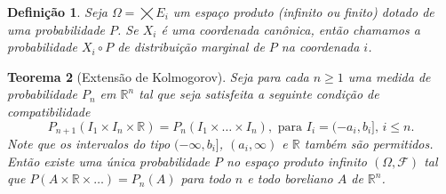\documentclass[reqno]{article}
\newcommand*\1{\mathds{1}}
\newtheorem{theorem}{Teorema}[section]
\newtheorem{definition}[theorem]{Definição}
\begin{document}
\begin{definition}
  Seja $\Omega = \bigtimes E_i$ um espaço produto (infinito ou finito) dotado de uma probabilidade $P$.
  Se $X_i$ é uma coordenada canônica, então chamamos a probabilidade $X_i \circ P$ de \emph{distribuição marginal} de $P$ na coordenada $i$.
\end{definition}

\begin{theorem}[Extensão de Kolmogorov]
  \label{t:extens_kolmog}
  Seja para cada $n \geq 1$ uma medida de probabilidade $P_n$ em $\mathbb{R}^n$ tal que seja satisfeita a seguinte condição de compatibilidade
  \begin{equation}
    \label{e:consist_kolmog}
    P_{n+1} (I_1 \times I_n \times \mathbb{R}) = P_n (I_1 \times \dots \times I_n), \text{ para $I_i = (-a_i, b_i]$, $i \leq n$}.
  \end{equation}
  Note que os intervalos do tipo $(-\infty, b_i]$, $(a_i, \infty)$ e $\mathbb{R}$ também são permitidos.
  Então existe uma única probabilidade $P$ no espaço produto infinito $(\Omega, \mathcal{F})$ tal que $P(A \times \mathbb{R} \times \dots) = P_n (A)$ para todo $n$ e todo boreliano $A$ de $\mathbb{R}^n$.
\end{theorem}
\end{document}

